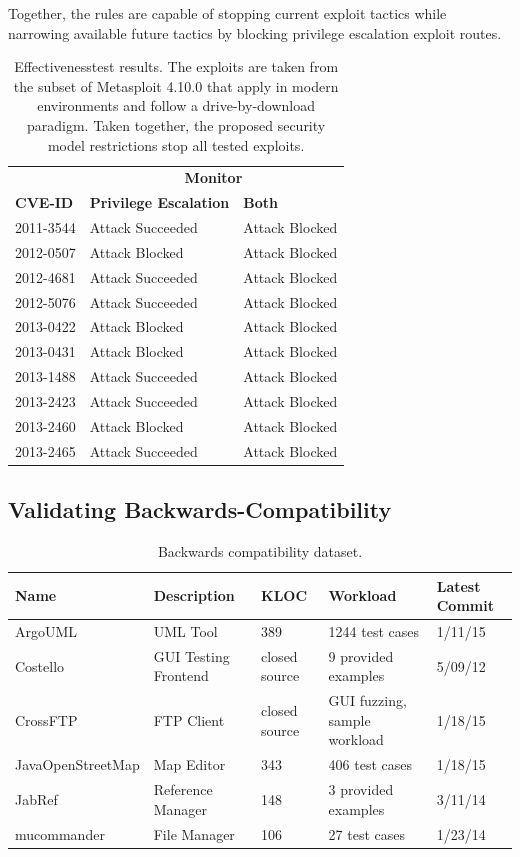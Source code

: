 \documentclass{sig-alternate}
\begin{document}
Together, the rules are capable of stopping current exploit tactics while
narrowing available future tactics by blocking privilege escalation exploit
routes.

\begin{table}
\caption{Effectiveness\label{tab:Exploit-experiment-summary} test results.  The
  exploits are taken from the subset of Metasploit 4.10.0 that apply in modern
  environments and follow a drive-by-download paradigm.
  Taken together, the proposed security model restrictions stop all tested exploits.}
\begin{tabular}{lll}
\toprule 
                & \multicolumn{2}{c}{\textbf{Monitor}} \\
\textbf{CVE-ID} & \textbf{Privilege Escalation} & \textbf{Both}\tabularnewline
\midrule
2011-3544 & Attack Succeeded  & Attack Blocked \\
2012-0507 & Attack Blocked & Attack Blocked \\
2012-4681 & Attack Succeeded  & Attack Blocked \\
2012-5076 & Attack Succeeded  & Attack Blocked \\
2013-0422 & Attack Blocked & Attack Blocked \\
2013-0431 & Attack Blocked & Attack Blocked \\
2013-1488 & Attack Succeeded  & Attack Blocked \\
2013-2423 & Attack Succeeded  & Attack Blocked \\
2013-2460 & Attack Blocked & Attack Blocked \\
2013-2465 & Attack Succeeded  & Attack Blocked \\
\bottomrule
\end{tabular}
\vspace{-4ex}
\end{table}

\subsection{Validating Backwards-Compatibility}\label{sec:backcompat}
\begin{table}
\caption{\label{tab:validation-programs}
Backwards compatibility dataset.}
\centering

\begin{tabular}{lllll}
\toprule 
\textbf{Name} & \textbf{Description} & \textbf{KLOC} & \textbf{Workload} & \textbf{Latest Commit}\tabularnewline
\midrule
ArgoUML & UML Tool & 389 & 1244 test cases & 1/11/15 \tabularnewline
Costello & GUI Testing Frontend & closed source & 9 provided examples & 5/09/12 \tabularnewline
CrossFTP & FTP Client & closed source & GUI fuzzing, sample workload & 1/18/15 \tabularnewline
JavaOpenStreetMap & Map Editor & 343 & 406 test cases & 1/18/15 \tabularnewline
JabRef & Reference Manager & 148 & 3 provided examples & 3/11/14 \tabularnewline 
mucommander & File Manager & 106 & 27 test cases & 1/23/14 \tabularnewline
\bottomrule
\end{tabular}
\vspace{-0.5cm}
\end{table}
\end{document}
